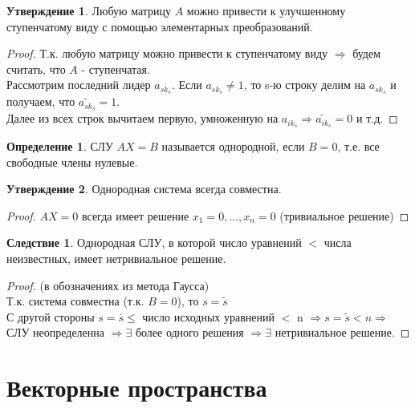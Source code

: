 \documentclass[a4paper, 12pt]{article}
\theoremstyle{definition}
\newtheorem*{definition}{Определение}
\newtheorem*{consequense}{Следствие}%
\newtheorem*{subtheorem}{Утверждение}
\begin{document}
  \begin{subtheorem}
    Любую матрицу $A$  можно привести к улучшенному ступенчатому виду с помощью элементарных преобразований.
  \end{subtheorem} 
  \begin{proof}
    Т.к. любую матрицу можно привести к ступенчатому виду $\Longrightarrow$ будем считать, что $A$ - ступенчатая. \\
    Рассмотрим последний лидер $a_{sk_s}$. Если $a_{sk_s} \neq 1$, то s-ю строку делим на $a_{sk_s}$ и получаем, что $\widetilde{a_{sk_s}}=1$. \\ Далее из всех строк вычитаем первую, умноженную на $a_{ik_s} \Longrightarrow \widetilde{a_{ik_s}}  =0$ и т.д. 
  \end{proof} 

  \begin{definition}
    СЛУ $AX=B$ называется однородной, если $B=0$, т.е. все свободные члены нулевые.  
  \end{definition} 
  \begin{subtheorem}
    Однородная система всегда совместна.
  \end{subtheorem} 
  \begin{proof}
    $AX=0$ всегда имеет решение $x_1=0,...,x_n=0$ (тривиальное решение)
  \end{proof} 
  \begin{consequense}
    Однородная СЛУ, в которой число уравнений $<$ числа неизвестных, имеет нетривиальное решение.  
  \end{consequense} 
  \begin{proof}
    (в обозначениях из метода Гаусса)\\
    Т.к. система совместна (т.к. $B=0$), то $s=\widetilde{s}$ \\
    С другой стороны $s=\overline{s} \leq$ число исходных уравнений $<$ n $\Longrightarrow s=\widetilde{s} < n \Longrightarrow$ СЛУ неопределенна $\Longrightarrow \exists$ более одного решения $\Longrightarrow \exists$ нетривиальное решение.     
  \end{proof} 

  \newpage
  \section{Векторные пространства}
\end{document}
